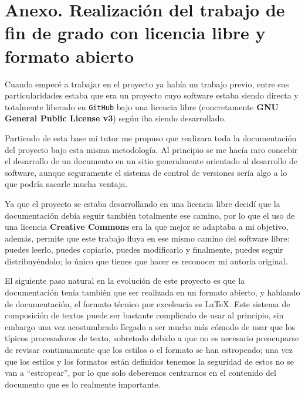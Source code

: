 \chapter*{Anexo. Realización del trabajo de fin de grado con licencia libre y formato abierto}

Cuando empecé a trabajar en el proyecto ya había un trabajo previo, entre sus particularidades estaba que era un proyecto cuyo software estaba siendo directa y totalmente liberado en {\tt GitHub} bajo una licencia libre (concretamente \textbf{GNU General Public License v3}) según iba siendo desarrollado.

\bigskip
Partiendo de esta base mi tutor me propuso que realizara toda la documentación del proyecto bajo esta misma metodología. Al principio se me hacía raro concebir el desarrollo de un documento en un sitio generalmente orientado al desarrollo de software, aunque seguramente el sistema de control de versiones sería algo a lo que podría sacarle mucha ventaja.

\bigskip
Ya que el proyecto se estaba desarrollando en una licencia libre decidí que la documentación debía seguir también totalmente ese camino, por lo que el uso de una licencia \textbf{Creative Commons} era la que mejor se adaptaba a mi objetivo, además, permite que este trabajo fluya en ese mismo camino del software libre: puedes leerlo, puedes copiarlo, puedes modificarlo y finalmente, puedes seguir distribuyéndolo; lo único que tienes que hacer es reconocer mi autoría original.

\bigskip
El siguiente paso natural en la evolución de este proyecto es que la documentación tenía también que ser realizada en un formato abierto, y hablando de documentación, el formato técnico por excelencia es \LaTeX. Este sistema de composición de textos puede ser bastante complicado de usar al principio, sin embargo una vez acostumbrado llegado a ser mucho más cómodo de usar que los típicos procesadores de texto, sobretodo debido a que no es necesario preocuparse de revisar continuamente que los estilos o el formato se han estropeado; una vez que los estilos y los formatos están definidos tenemos la seguridad de estos no se van a ``estropear'', por lo que solo deberemos centrarnos en el contenido del documento que es lo realmente importante.

